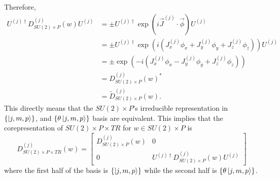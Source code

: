 \documentclass[preprint, 12pt]{revtex4-2}
\numberwithin{equation}{section}
\begin{document}
Therefore,
\begin{equation}
    \begin{aligned}
        U^{(j)\dagger}D^{(j)}_{SU(2)\times P}(w)U^{(j)} &= \pm U^{(j)\dagger}\exp(i\vec{J}^{(j)}\cdot\vec{\phi})U^{(j)} \\ 
        &= \pm U^{(j)\dagger}\exp(i(J_x^{(j)}\phi_x+J_y^{(j)}\phi_y+J_z^{(j)}\phi_z))U^{(j)} \\
        &= \pm\exp(-i(J_x^{(j)}\phi_x-J_y^{(j)}\phi_y+J_z^{(j)}\phi_z)) \\
        &= D^{(j)}_{SU(2)\times P}(w)^\ast \\
        &= \tilde{D}^{(j)}_{SU(2)\times P}(w).
    \end{aligned}
\end{equation}
This directly means that the $SU(2)\times P$'s irreducible representation in $\{\ket{j, m, p}\}$, and $\{\theta\ket{j, m, p}\}$ basis are equivalent. This implies that the corepresentation of $SU(2)\times P\times TR$ for $w\in SU(2)\times P$ is
\begin{equation}
    D_{SU(2)\times P\times TR}^{(j)}(w) = 
    \begin{bmatrix}
        D^{(j)}_{SU(2)\times P}(w) & 0 \\
        0 & U^{(j)\dagger}D^{(j)}_{SU(2)\times P}(w)U^{(j)}
    \end{bmatrix}
\end{equation}
where the first half of the basis is $\{\ket{j, m, p}\}$ while the second half is $\{\theta\ket{j, m, p}\}$.
\end{document}
